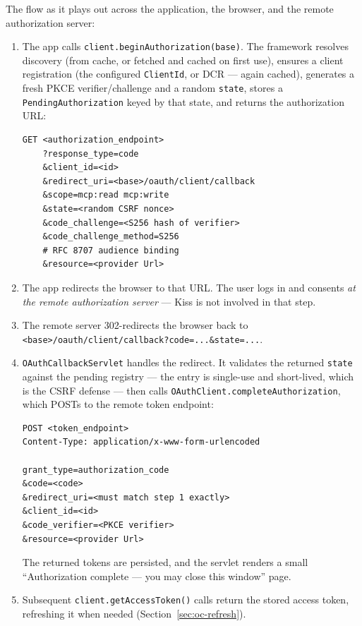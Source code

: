 The flow as it plays out across the application, the browser, and the remote authorization server:

\begin{enumerate}
  \item The app calls \texttt{client.beginAuthorization(base)}.  The framework resolves discovery (from cache, or fetched and cached on first use), ensures a client registration (the configured \texttt{ClientId}, or DCR --- again cached), generates a fresh PKCE verifier/challenge and a random \texttt{state}, stores a \texttt{PendingAuthorization} keyed by that state, and returns the authorization URL:

\begin{lstlisting}[style=shell]
GET <authorization_endpoint>
    ?response_type=code
    &client_id=<id>
    &redirect_uri=<base>/oauth/client/callback
    &scope=mcp:read mcp:write
    &state=<random CSRF nonce>
    &code_challenge=<S256 hash of verifier>
    &code_challenge_method=S256
    # RFC 8707 audience binding
    &resource=<provider Url>
\end{lstlisting}

  \item The app redirects the browser to that URL.  The user logs in and consents \emph{at the remote authorization server} --- Kiss is not involved in that step.
  \item The remote server 302-redirects the browser back to \texttt{<base>/oauth/client/callback?code=...\&state=...}.
  \item \texttt{OAuthCallbackServlet} handles the redirect.  It validates the returned \texttt{state} against the pending registry --- the entry is single-use and short-lived, which is the CSRF defense --- then calls \texttt{OAuthClient.completeAuthorization}, which POSTs to the remote token endpoint:

\begin{lstlisting}[style=shell]
POST <token_endpoint>
Content-Type: application/x-www-form-urlencoded

grant_type=authorization_code
&code=<code>
&redirect_uri=<must match step 1 exactly>
&client_id=<id>
&code_verifier=<PKCE verifier>
&resource=<provider Url>
\end{lstlisting}

  The returned tokens are persisted, and the servlet renders a small ``Authorization complete --- you may close this window'' page.
  \item Subsequent \texttt{client.getAccessToken()} calls return the stored access token, refreshing it when needed (Section~\ref{sec:oc-refresh}).
\end{enumerate}

